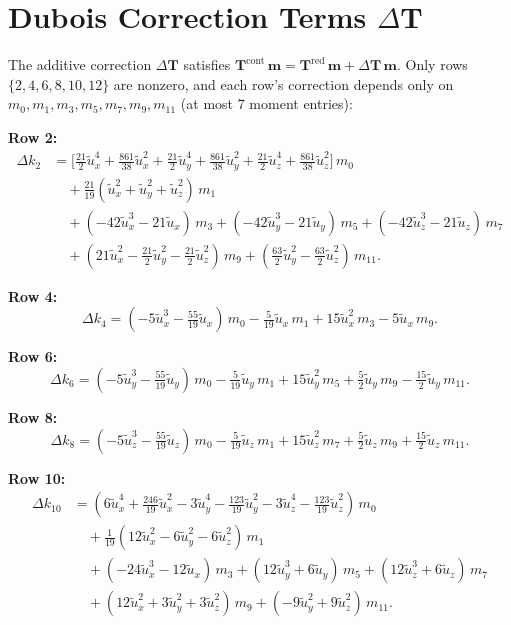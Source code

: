\documentclass[11pt,a4paper]{article}
\newcommand{\vect}[1]{\bm{#1}}
\newcommand{\mat}[1]{\bm{#1}}
\newcommand{\Tmat}{\mat{T}}
\newcommand{\tu}{\tilde{u}}
\begin{document}
\section{Dubois Correction Terms \texorpdfstring{$\Delta\Tmat$}{Delta T}}\label{app:correction}

The additive correction $\Delta\Tmat$ satisfies $\Tmat^{\text{cont}}\,\vect{m} = \Tmat^{\text{red}}\,\vect{m} + \Delta\Tmat\,\vect{m}$.
Only rows $\{2,4,6,8,10,12\}$ are nonzero, and each row's correction depends only on $m_0, m_1, m_3, m_5, m_7, m_9, m_{11}$ (at most 7 moment entries):

\medskip
\noindent\textbf{Row 2:}
\begin{align}
  \Delta k_2 &= \bigl[\tfrac{21}{2}\tu_x^4 + \tfrac{861}{38}\tu_x^2 + \tfrac{21}{2}\tu_y^4 + \tfrac{861}{38}\tu_y^2 + \tfrac{21}{2}\tu_z^4 + \tfrac{861}{38}\tu_z^2\bigr]\,m_0 \nonumber\\
  &\quad + \tfrac{21}{19}(\tu_x^2 + \tu_y^2 + \tu_z^2)\,m_1 \nonumber\\
  &\quad + (-42\tu_x^3 - 21\tu_x)\,m_3 + (-42\tu_y^3 - 21\tu_y)\,m_5 + (-42\tu_z^3 - 21\tu_z)\,m_7 \nonumber\\
  &\quad + (21\tu_x^2 - \tfrac{21}{2}\tu_y^2 - \tfrac{21}{2}\tu_z^2)\,m_9 + (\tfrac{63}{2}\tu_y^2 - \tfrac{63}{2}\tu_z^2)\,m_{11}. \label{eq:delta2}
\end{align}

\noindent\textbf{Row 4:}
\begin{equation}\label{eq:delta4}
  \Delta k_4 = (-5\tu_x^3 - \tfrac{55}{19}\tu_x)\,m_0 - \tfrac{5}{19}\tu_x\,m_1 + 15\tu_x^2\,m_3 - 5\tu_x\,m_9.
\end{equation}

\noindent\textbf{Row 6:}
\begin{equation}\label{eq:delta6}
  \Delta k_6 = (-5\tu_y^3 - \tfrac{55}{19}\tu_y)\,m_0 - \tfrac{5}{19}\tu_y\,m_1 + 15\tu_y^2\,m_5 + \tfrac{5}{2}\tu_y\,m_9 - \tfrac{15}{2}\tu_y\,m_{11}.
\end{equation}

\noindent\textbf{Row 8:}
\begin{equation}\label{eq:delta8}
  \Delta k_8 = (-5\tu_z^3 - \tfrac{55}{19}\tu_z)\,m_0 - \tfrac{5}{19}\tu_z\,m_1 + 15\tu_z^2\,m_7 + \tfrac{5}{2}\tu_z\,m_9 + \tfrac{15}{2}\tu_z\,m_{11}.
\end{equation}

\noindent\textbf{Row 10:}
\begin{align}
  \Delta k_{10} &= (6\tu_x^4 + \tfrac{246}{19}\tu_x^2 - 3\tu_y^4 - \tfrac{123}{19}\tu_y^2 - 3\tu_z^4 - \tfrac{123}{19}\tu_z^2)\,m_0 \nonumber\\
  &\quad + \tfrac{1}{19}(12\tu_x^2 - 6\tu_y^2 - 6\tu_z^2)\,m_1 \nonumber\\
  &\quad + (-24\tu_x^3 - 12\tu_x)\,m_3 + (12\tu_y^3 + 6\tu_y)\,m_5 + (12\tu_z^3 + 6\tu_z)\,m_7 \nonumber\\
  &\quad + (12\tu_x^2 + 3\tu_y^2 + 3\tu_z^2)\,m_9 + (-9\tu_y^2 + 9\tu_z^2)\,m_{11}. \label{eq:delta10}
\end{align}
\end{document}
